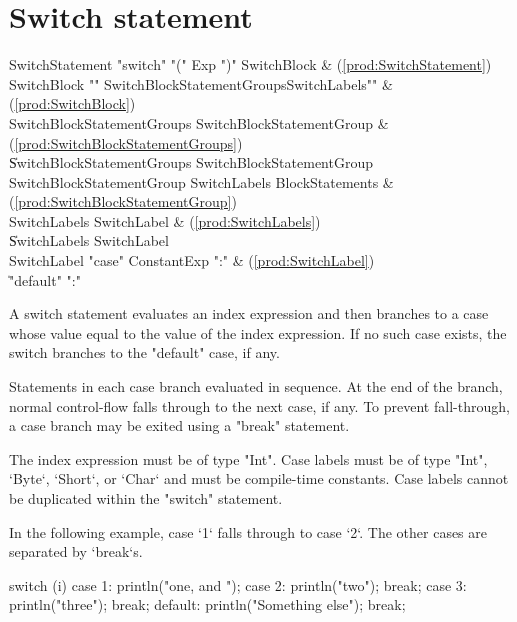 \section{Switch statement}

\begin{bbgrammar}
 SwitchStatement    \: \xcd"switch" \xcd"(" Exp \xcd")" SwitchBlock & (\ref{prod:SwitchStatement})\\%


 SwitchBlock    \: \xcd"{" SwitchBlockStatementGroups\opt SwitchLabels\opt \xcd"}" & (\ref{prod:SwitchBlock})\\%
 SwitchBlockStatementGroups    \: SwitchBlockStatementGroup & (\ref{prod:SwitchBlockStatementGroups})\\%
    \| SwitchBlockStatementGroups SwitchBlockStatementGroup\\
 SwitchBlockStatementGroup    \: SwitchLabels BlockStatements & (\ref{prod:SwitchBlockStatementGroup})\\%
 SwitchLabels    \: SwitchLabel & (\ref{prod:SwitchLabels})\\%
    \| SwitchLabels SwitchLabel\\
 SwitchLabel    \: \xcd"case" ConstantExp \xcd":" & (\ref{prod:SwitchLabel})\\%
    \| \xcd"default" \xcd":"\\

\end{bbgrammar}


A switch statement evaluates an index expression and then branches to
a case whose value equal to the value of the index expression.
If no such case exists, the switch branches to the 
\xcd"default" case, if any.

Statements in each case branch evaluated in sequence.  At the
end of the branch, normal control-flow falls through to the next case, if
any.  To prevent fall-through, a case branch may be exited using
a \xcd"break" statement.

The index expression must be of type \xcd"Int".
Case labels must be of type \xcd"Int", \xcd`Byte`, \xcd`Short`, or \xcd`Char`
and must be compile-time 
constants.  Case labels cannot be duplicated within the
\xcd"switch" statement.

In the following example, case \xcd`1` falls through to case \xcd`2`.  The
other cases are separated by \xcd`break`s.
\begin{xten}
switch (i) {
  case 1: println("one, and ");
  case 2: println("two"); 
          break;
  case 3: println("three");
          break;
  default: println("Something else");
           break;
}
\end{xten}



